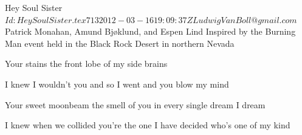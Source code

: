 \begin{SBSong}{Hey Soul Sister}
    {$Id: HeySoulSister.tex 713 2012-03-16 19:09:37Z LudwigVanBoll@gmail.com $}
    {Patrick Monahan, Amund Bj\o klund, and Espen Lind}
    {Inspired by the Burning Man event held in the Black Rock Desert in northern Nevada}
  \begin{SBVerse}
    Your  stains  the front lobe of my  side brains 

    I knew I wouldn't  you and so I went and  you blow my mind

    Your sweet moonbeam the smell of you in every single dream I dream

    I knew when we collided you're the one I have decided who's one of my kind
  \end{SBVerse}
\end{SBSong}
